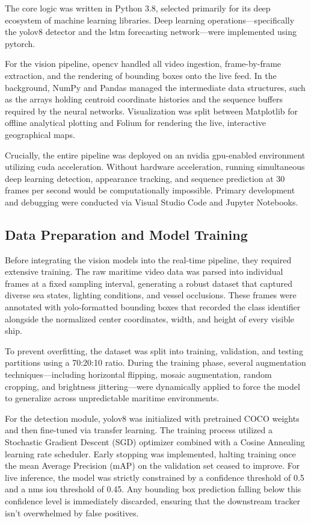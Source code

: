 The core logic was written in Python 3.8, selected primarily for its deep ecosystem of machine learning libraries. Deep learning operations—specifically the \gls{yolov8} detector and the \gls{lstm} forecasting network—were implemented using \gls{pytorch}. 

For the vision pipeline, \gls{opencv} handled all video ingestion, frame-by-frame extraction, and the rendering of bounding boxes onto the live feed. In the background, NumPy and Pandas managed the intermediate data structures, such as the arrays holding centroid coordinate histories and the sequence buffers required by the neural networks. Visualization was split between Matplotlib for offline analytical plotting and Folium for rendering the live, interactive geographical maps.

Crucially, the entire pipeline was deployed on an \gls{nvidia} \gls{gpu}-enabled environment utilizing \gls{cuda} acceleration. Without hardware acceleration, running simultaneous deep learning detection, appearance tracking, and sequence prediction at 30 frames per second would be computationally impossible. Primary development and debugging were conducted via Visual Studio Code and Jupyter Notebooks.

\subsection{Data Preparation and Model Training}

Before integrating the vision models into the real-time pipeline, they required extensive training. The raw maritime video data was parsed into individual frames at a fixed sampling interval, generating a robust dataset that captured diverse sea states, lighting conditions, and vessel occlusions. These frames were annotated with \gls{yolo}-formatted bounding boxes that recorded the class identifier alongside the normalized center coordinates, width, and height of every visible ship. 

To prevent overfitting, the dataset was split into training, validation, and testing partitions using a 70:20:10 ratio. During the training phase, several augmentation techniques—including horizontal flipping, mosaic augmentation, random cropping, and brightness jittering—were dynamically applied to force the model to generalize across unpredictable maritime environments.

For the detection module, \gls{yolov8} was initialized with pretrained COCO weights and then fine-tuned via transfer learning. The training process utilized a Stochastic Gradient Descent (SGD) optimizer combined with a Cosine Annealing learning rate scheduler. Early stopping was implemented, halting training once the mean Average Precision (mAP) on the validation set ceased to improve. For live inference, the model was strictly constrained by a confidence threshold of 0.5 and a \gls{nms} \gls{iou} threshold of 0.45. Any bounding box prediction falling below this confidence level is immediately discarded, ensuring that the downstream tracker isn't overwhelmed by false positives.

